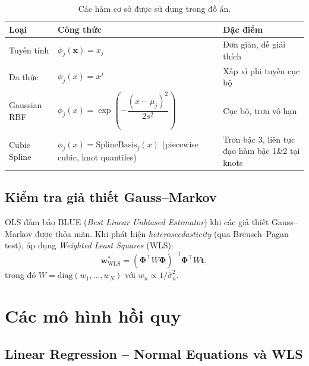 \documentclass[12pt,a4paper]{article}
\begin{document}
\begin{table}[H]
  \centering
  \caption{Các hàm cơ sở được sử dụng trong đồ án.}
  \label{tab:basis_functions}
  \begin{tabular}{lll}
    \toprule
    \textbf{Loại} & \textbf{Công thức} & \textbf{Đặc điểm} \\
    \midrule
    Tuyến tính    & $\phi_j(\mathbf{x}) = x_j$
                  & Đơn giản, dễ giải thích \\
    Đa thức       & $\phi_j(x) = x^j$
                  & Xấp xỉ phi tuyến cục bộ \\
    Gaussian RBF  & $\phi_j(x) = \exp\!\left(-\dfrac{(x-\mu_j)^2}{2s^2}\right)$
                  & Cục bộ, trơn vô hạn \\
    Cubic Spline
      & $\phi_j(x) = \text{SplineBasis}_j(x)$ (piecewise cubic, knot quantiles)
      & Trơn bậc 3, liên tục đạo hàm bậc 1\&2 tại knots \\
    \bottomrule
  \end{tabular}
\end{table}

\subsection{Kiểm tra giả thiết Gauss--Markov}

OLS đảm bảo BLUE (\emph{Best Linear Unbiased Estimator}) khi các giả thiết
Gauss--Markov được thỏa mãn. Khi phát hiện \emph{heteroscedasticity}
(qua Breusch--Pagan test), áp dụng \emph{Weighted Least Squares} (WLS):
\begin{equation}
  \mathbf{w}^*_{\text{WLS}} = (\boldsymbol{\Phi}^\top W \boldsymbol{\Phi})^{-1}
                                \boldsymbol{\Phi}^\top W \mathbf{t},
  \label{eq:wls}
\end{equation}
trong đó $W = \text{diag}(w_1, \dots, w_N)$ với $w_n \propto 1/\hat{\sigma}^2_n$.

\section{Các mô hình hồi quy}
\label{sec:models}

\subsection{Linear Regression -- Normal Equations và WLS}
\label{ssec:lr_ne}
\end{document}
